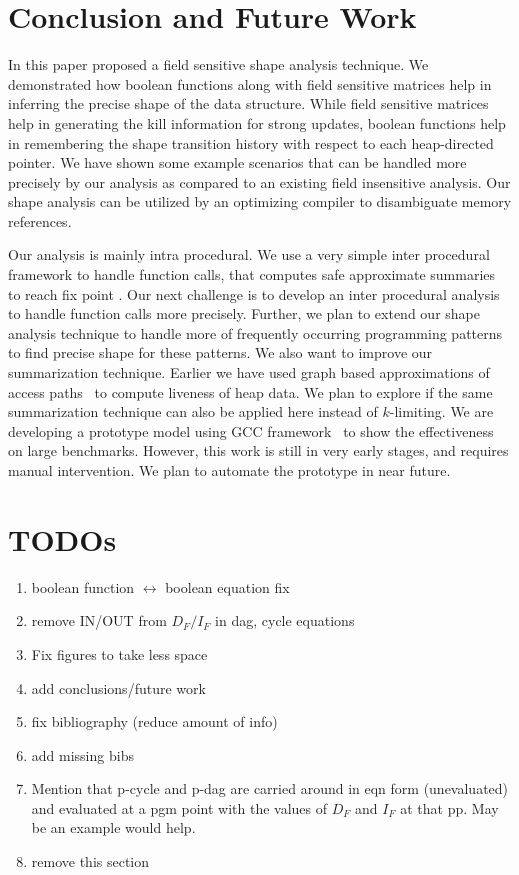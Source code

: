 \documentclass[runningheads,a4paper]{llncs}
\begin{document}
\section{Conclusion and Future Work} \label{sec:concl}

In this paper proposed a field sensitive shape analysis
technique. We demonstrated how boolean functions along with
field sensitive matrices help in inferring the precise shape
of the data structure.  While field sensitive matrices help
in generating the kill information for strong updates,
boolean functions help in remembering the shape transition
history with respect to each heap-directed pointer. We have
shown some example scenarios that can be handled more
precisely by our analysis as compared to an existing field
insensitive analysis. Our shape analysis can be utilized by
an optimizing compiler to disambiguate memory references.

Our analysis is mainly intra procedural. We use a very simple
inter procedural framework to handle function calls, that
computes safe approximate summaries to reach fix point .  Our
next challenge is to develop an inter procedural analysis to
handle function calls more precisely. Further, we plan to
extend our shape analysis technique to handle more of
frequently occurring programming patterns to find precise
shape for these patterns.  We also want to improve our
summarization technique. Earlier we have used graph based
approximations of access paths~\cite{khedker07heap} to
compute liveness of heap data. We plan to explore if the same
summarization technique can also be applied here instead of
$k$-limiting. We are developing a prototype model using GCC
framework~\cite{gcc-web} to show the effectiveness on large
benchmarks. However, this work is still in very early stages,
and requires manual intervention. We plan to automate the
prototype in near future.

{\red\bf
\tableofcontents

\section{TODOs}

\begin{enumerate}
\item {\green boolean function $\leftrightarrow$ boolean equation fix}
\item {\green remove {IN/OUT} from $D_F/I_F$ in dag, cycle equations}
\item Fix figures to take less space
\item {\green add conclusions/future work}
\item {\green fix bibliography (reduce amount of info)}
\item {\green add missing bibs}
\item Mention that p-cycle and p-dag are carried around in
  eqn form (unevaluated) and evaluated at a pgm point with the values of
  $D_F$ and $I_F$ at that pp. May be an example would help.
\item remove this section 
\end{enumerate}
\clearpage
}



\end{document}

